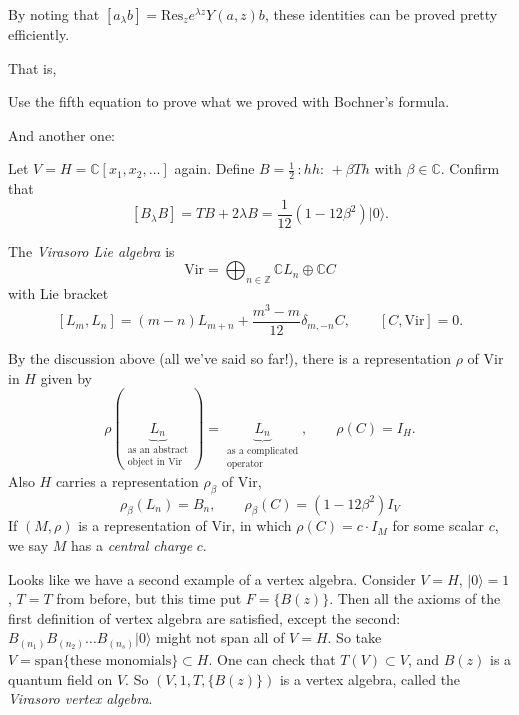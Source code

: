 \begin{remark}
\label{remark-how-to-use}
By noting that $[a_\lambda b]=\text{Res}_ze^{\lambda z}Y(a,z)b$,
these identities can be proved pretty efficiently.
\end{remark}

That is,

\begin{exercise}
\label{exercise-use-the-5th}
Use the fifth equation to prove what we proved with Bochner's formula.
\end{exercise}

And another one:

\begin{exercise}
\label{exercise-}
Let $V=H=\mathbb{C}[x_1,x_2,\ldots]$ again.
Define $B=\frac{1}{2}\,:\!h h\!:\,+\beta Th$ with $\beta \in \mathbb{C}$.
Confirm that 
$$
[B_\lambda B]=TB+2\lambda B=\frac{1}{12}(1-12\beta^2)|0\rangle.
$$
\end{exercise}

\begin{definition}
\label{definition-Virasoro-Lie-algebra}
The {\it Virasoro Lie algebra} is
$$
\text{Vir}=\bigoplus_{n \in \mathbb{Z}}\mathbb{C}L_n \oplus \mathbb{C}C
$$
with Lie bracket
$$
[L_m,L_n]=(m-n)L_{m+n}+\frac{m^3-m}{12}\delta_{m,-n}C,\qquad [C,\text{Vir}]=0.
$$
\end{definition}
By the discussion above (all we've said so far!),
there is a representation $\rho$ of $\text{Vir}$ in $H$ 
given by
$$
\rho(\underbrace{L_n}_{\substack{\text{as an abstract} \\ 
\text{object in Vir}}})
=\underbrace{L_n}_{\substack{\text{as a complicated} \\ \text{operator}}},
\qquad \rho(C)=I_H.
$$
Also $H$ carries a representation $\rho_\beta$ of $\text{Vir}$,
$$
\rho_\beta(L_n)=B_n,\qquad \rho_\beta(C)=(1-12\beta^2)I_V
$$
If $(M,\rho)$ is a representation of $\text{Vir}$, in which 
 $\rho(C)=c\cdot I_M$ for some scalar $c$, we say $M$ has a
{\it central charge} $c$.

Looks like we have a second example of a vertex algebra.
Consider $V=H$, $|0\rangle=1$, $T=T$ from before, but this time put
$F=\{B(z)\}$. Then all the axioms of the first definition of vertex
algebra are satisfied, except the second: 
$B_{(n_1)}B_{(n_2)}\ldots B_{(n_s)}|0\rangle$
might not span all of $V=H$.
So take $V=\text{span}\{\text{these monomials}\}\subset H$.
One can check that $T(V) \subset V$, and
$B(z)$ is a quantum field on $V$.
So $(V,1,T,\{B(z)\})$ is a vertex algebra, called the 
{\it Virasoro vertex algebra}.

